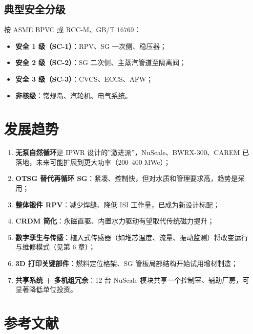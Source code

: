 \documentclass[
  UTF8,
  scheme=plain,
  fontsize=10pt,
  openany
]{ctexbook}
\begin{document}
\subsection{典型安全分级}\label{ux5178ux578bux5b89ux5168ux5206ux7ea7}

按 ASME BPVC 或 RCC-M、GB/T 16769：

\begin{itemize}
\tightlist
\item
  \textbf{安全 1 级（SC-1）}：RPV、SG 一次侧、稳压器；
\item
  \textbf{安全 2 级（SC-2）}：SG 二次侧、主蒸汽管道至隔离阀；
\item
  \textbf{安全 3 级（SC-3）}：CVCS、ECCS、AFW；
\item
  \textbf{非核级}：常规岛、汽轮机、电气系统。
\end{itemize}

\section{发展趋势}\label{ux53d1ux5c55ux8d8bux52bf-2}

\begin{enumerate}
\def\labelenumi{\arabic{enumi}.}
\tightlist
\item
  \textbf{无泵自然循环}是 IPWR
  设计的''激进派''，NuScale、BWRX-300、CAREM
  已落地，未来可能扩展到更大功率（200--400 MWe）；
\item
  \textbf{OTSG 替代再循环
  SG}：紧凑、控制快，但对水质和管理要求高，趋势是采用；
\item
  \textbf{整体锻件 RPV}：减少焊缝、降低 ISI 工作量，已成为新设计标配；
\item
  \textbf{CRDM 简化}：永磁直驱、内置水力驱动有望取代传统磁力提升；
\item
  \textbf{数字孪生与传感}：植入式传感器（如堆芯温度、流量、振动监测）将改变运行与维修模式（见第
  6 章）；
\item
  \textbf{3D 打印关键部件}：燃料定位格架、SG
  管板局部结构开始试用增材制造；
\item
  \textbf{共享系统 + 多机组冗余}：12 台 NuScale
  模块共享一个控制室、辅助厂房，可显著降低单位投资。
\end{enumerate}

\section{参考文献}\label{ux53c2ux8003ux6587ux732e-4}
\end{document}

